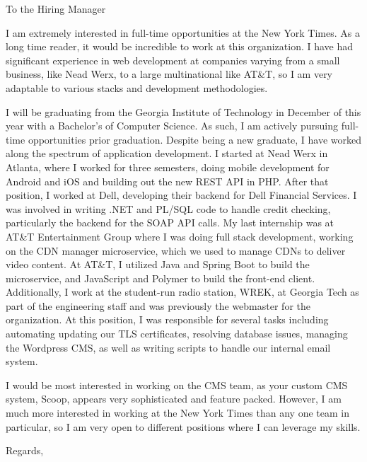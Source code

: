 \documentclass{letter}
\begin{document}
\begin{letter}{}
	\opening{To the Hiring Manager}

	I am extremely interested in full-time opportunities at the New York Times. As a long time reader, it would be incredible to work at this organization. I have had significant experience in web development at companies varying from a small business, like Nead Werx, to a large multinational like AT\&T, so I am very adaptable to various stacks and development methodologies.

	I will be graduating from the Georgia Institute of Technology in December of this year with a Bachelor's of Computer Science. As such, I am actively pursuing full-time opportunities prior graduation. Despite being a new graduate, I have worked along the spectrum of application development. I started at Nead Werx in Atlanta, where I worked for three semesters, doing mobile development for Android and iOS and building out the new REST API in PHP. After that position, I worked at Dell, developing their backend for Dell Financial Services. I was involved in writing .NET and PL/SQL code to handle credit checking, particularly the backend for the SOAP API calls. My last internship was at AT\&T Entertainment Group where I was doing full stack development, working on the CDN manager microservice, which we used to manage CDNs to deliver video content. At AT\&T, I utilized Java and Spring Boot to build the microservice, and JavaScript and Polymer to build the front-end client. Additionally, I work at the student-run radio station, WREK, at Georgia Tech as part of the engineering staff and was previously the webmaster for the organization. At this position, I was responsible for several tasks including automating updating our TLS certificates, resolving database issues, managing the Wordpress CMS, as well as writing scripts to handle our internal email system.

	I would be most interested in working on the CMS team, as your custom CMS system, Scoop, appears very sophisticated and feature packed. However, I am much more interested in working at the New York Times than any one team in particular, so I am very open to different positions where I can leverage my skills.

\closing{Regards,}
\end{letter}
\end{document}
